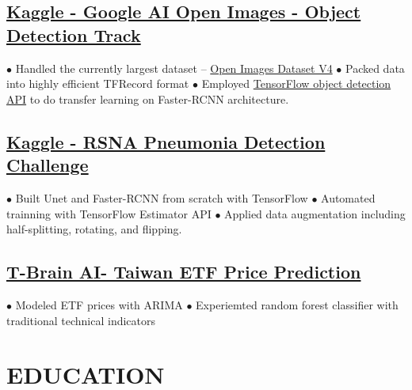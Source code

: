 \documentclass[11pt,a4paper]{moderncv}
\begin{document}
\subsection{\href{https://www.kaggle.com/c/google-ai-open-images-object-detection-track}{\small Kaggle - Google AI Open Images - Object Detection Track}}
{\footnotesize{$\bullet$ Handled the currently largest dataset -- \href{https://storage.googleapis.com/openimages/web/index.html}{Open Images Dataset V4}  \space\space $\bullet$ Packed data into highly efficient TFRecord format
\newline $\bullet$ Employed \href{https://github.com/tensorflow/models/tree/master/research/object_detection}{TensorFlow object detection API} to do transfer learning on Faster-RCNN architecture.}}

\subsection{\href{https://www.kaggle.com/c/rsna-pneumonia-detection-challenge}{\small Kaggle - RSNA Pneumonia Detection Challenge}}
{\footnotesize{$\bullet$ Built Unet and Faster-RCNN from scratch with TensorFlow \space\space $\bullet$ Automated trainning with TensorFlow Estimator API
\newline $\bullet$ Applied data augmentation including half-splitting, rotating, and flipping.}}

\subsection{\href{https://tbrain.trendmicro.com.tw/Competitions/Details/2}{\small T-Brain AI- Taiwan ETF Price Prediction}}
{\footnotesize{$\bullet$ Modeled ETF prices with ARIMA \space\space $\bullet$ Experiemted random forest classifier with traditional technical indicators}}
\vspace{-0.7\baselineskip}

\section{EDUCATION}
\vspace{-0.75\baselineskip}
\end{document}
